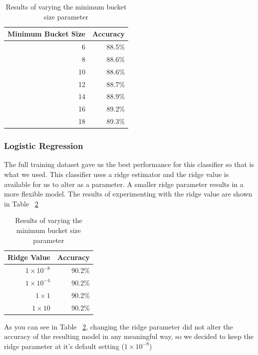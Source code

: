 \documentclass[a4paper,11pt]{article}
\begin{document}
\begin{table}[H]
  \begin{center}
    \begin{tabular}{r | r }
      Minimum Bucket Size & Accuracy  \\ \hline
      6 & 88.5\% \\
      8 & 88.6\% \\
      10 & 88.6\% \\
      12 & 88.7\% \\
      14 & 88.9\% \\
      16 & 89.2\% \\
      18 & 89.3\% \\
    \end{tabular}
  \end{center}
  \caption{Results of varying the minimum bucket size parameter}
  \label{tab:OneRParams}
\end{table}


\subsubsection{Logistic Regression}

The full training dataset gave us the best performance for this classifier so that is what we used.  This classifier uses
a ridge estimator and the ridge value is available for us to alter as a parameter. A smaller ridge parameter results
in a more flexible model. The results of experimenting with the ridge value are shown in Table ~\ref{tab:LogisticParams}

\begin{table}[H]
  \begin{center}
    \begin{tabular}{r | r }
      Ridge Value & Accuracy  \\ \hline
      $ 1 \times 10^{-8} $ & 90.2\% \\
      $ 1 \times 10^{-4} $ & 90.2\% \\
      $ 1 \times 1 $ & 90.2\% \\
      $ 1 \times 10 $ & 90.2\% \\
    \end{tabular}
  \end{center}
  \caption{Results of varying the minimum bucket size parameter}
  \label{tab:LogisticParams}
\end{table}

As you can see in Table ~\ref{tab:LogisticParams}, changing the ridge parameter did not alter the accuracy of the resulting
model in any meaningful way, so we decided to keep the ridge parameter at it's default setting ($ 1 \times 10^{-8} $)
\end{document}
